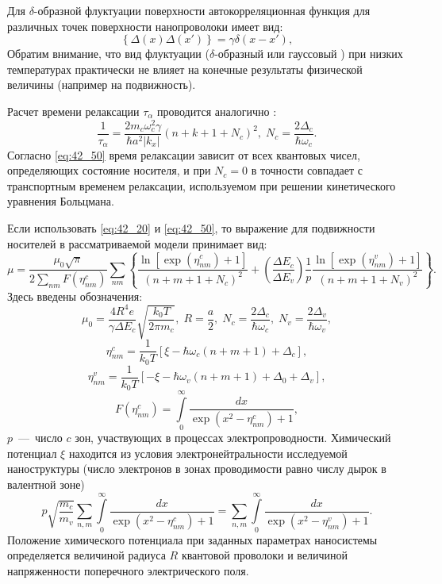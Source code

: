 Для $\delta $-образной флуктуации поверхности автокорреляционная функция для различных точек поверхности нанопроволоки имеет вид:
\begin{equation} \label{eq:42_40}
\left\{\Delta (x)\Delta (x')\right\}=\gamma \delta (x-x'),
\end{equation} 
Обратим внимание, что вид флуктуации ($\delta $-образный или гауссовый \cite{Sakaki1987}) при низких температурах практически не влияет на конечные результаты физической величины (например на подвижность).

Расчет времени релаксации $\tau _{\alpha } $ проводится аналогично \cite{Karapetyan2011}:
\begin{equation} \label{eq:42_50}
\frac{1}{\tau _{\alpha } } =\frac{2m_c \omega_c^2 \gamma }{\hbar a^2 \left|k_x \right|} \left(n+k+1+N_c \right)^2 , \;
N_c =\frac{2\Delta_c }{\hbar \omega_c } .
\end{equation} 
Согласно \eqref{eq:42_50} время релаксации зависит от всех квантовых чисел, определяющих состояние носителя, и при $N_c = 0$ в точности совпадает с транспортным временем релаксации, используемом при решении кинетического уравнения Больцмана.

Если использовать \eqref{eq:42_20} и \eqref{eq:42_50}, то выражение для подвижности носителей в рассматриваемой модели принимает вид:
\begin{equation} \label{eq:42_60}
\mu =\frac{\mu_0\sqrt{\pi } }{2\sum_{nm} F(\eta_{nm}^c )} \sum_{nm}\left\{\frac{\ln \left[\exp \left(\eta _{nm}^c \right)+1\right]}{\left(n+m+1+N_c \right)^2 } +\left(\frac{\Delta E_c }{\Delta E_v } \right)\frac{1}{p} \frac{\ln \left[\exp \left(\eta_{nm}^v \right)+1\right]}{\left(n+m+1+N_v \right)^2 } \right\} . 
\end{equation} 
Здесь введены обозначения:
\[
\mu_0 =\frac{4R^4 e}{\gamma \Delta E_c } \sqrt{\frac{k_0 T}{2\pi m_c } }, \;
R=\frac{a}{2}, \;
N_c =\frac{2\Delta_c }{\hbar \omega_c }, \;
N_v =\frac{2\Delta_v }{\hbar \omega_v },
\] 
\[
\eta_{nm}^c =\frac{1}{k_0 T} \left[\xi -\hbar \omega_c \left(n+m+1\right)+\Delta_c \right],
\] 
\[
\eta_{nm}^v =\frac{1}{k_0 T} \left[-\xi -\hbar \omega_v \left(n+m+1\right)+\Delta_0 +\Delta_v \right],
\] 
\[
F(\eta_{nm}^c )=\int\limits_0^{\infty }{\frac{dx}{\exp \left(x^2 -\eta_{nm}^c \right)+1}}  ,
\] 
$p$~---~число $c$ зон, участвующих в процессах электропроводности. Химический потенциал $\xi $ находится из условия электронейтральности исследуемой наноструктуры (число электронов в зонах проводимости равно числу дырок в валентной зоне)
\begin{equation} \label{eq:42_70}
p\sqrt{\frac{m_c }{m_v } } \sum_{n,m}\int\limits_{0}^{\infty }{\frac{dx}{\exp \left(x^2 -\eta_{nm}^c \right)+1}}  =
\sum_{n,m}\int\limits_{0}^{\infty }{\frac{dx}{\exp \left(x^2 -\eta_{nm}^v \right)+1}}. 
\end{equation} 
Положение химического потенциала при заданных параметрах наносистемы определяется величиной радиуса $R$ квантовой проволоки и величиной напряженности поперечного электрического поля.

